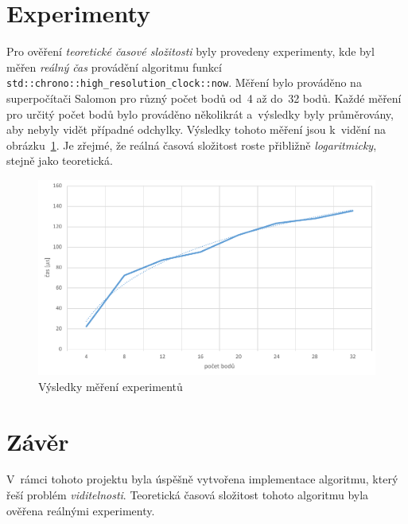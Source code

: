 \documentclass[a4paper, 10pt, twocolumn]{article}
\begin{document}
    \section{Experimenty}

    Pro ověření \emph{teoretické časové složitosti} byly provedeny
    experimenty, kde byl měřen \emph{reálný čas} provádění algoritmu funkcí
    \texttt{std::chrono::high\_resolution\_clock::now}. Měření bylo
    prováděno na superpočítači Salomon pro různý počet bodů od~4 až
    do~32 bodů. Každé měření pro určitý počet bodů bylo prováděno několikrát
    a~výsledky byly průměrovány, aby nebyly vidět případné odchylky.
    Výsledky tohoto měření jsou k~vidění na obrázku~\ref{fig:experiment}.
    Je zřejmé, že reálná časová složitost roste přibližně
    \emph{logaritmicky}, stejně jako teoretická.

    \begin{figure}[ht]
        \centering
        \includegraphics[width=1 \linewidth]{img/experiments.pdf}
        \caption{Výsledky měření experimentů}
        \label{fig:experiment}
    \end{figure}


    \section{Závěr}

    V~rámci tohoto projektu byla úspěšně vytvořena implementace algoritmu,
    který řeší problém \emph{viditelnosti}. Teoretická časová složitost
    tohoto algoritmu byla ověřena reálnými experimenty.
\end{document}
